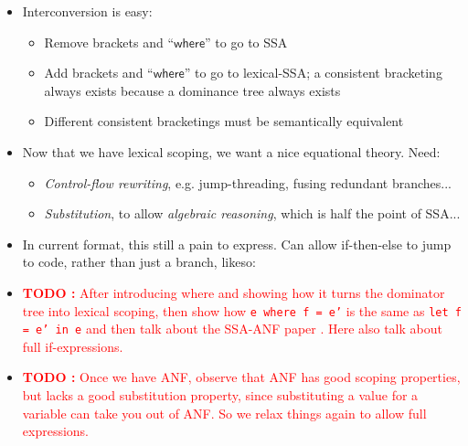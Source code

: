 \documentclass[acmsmall,screen,review]{acmart}
\newcounter{todos}
\newcommand{\TODO}[1]{{
  \stepcounter{todos}
  \begin{center}\large{\textcolor{red}{\textbf{TODO \arabic{todos}:} #1}}\end{center}
}}
\newcommand{\ms}[1]{\ensuremath{\mathsf{#1}}}
\begin{document}
\begin{itemize}
  \item Interconversion is easy:
  \begin{itemize}
    \item Remove brackets and ``\ms{where}'' to go to SSA
    \item Add brackets and ``\ms{where}'' to go to lexical-SSA; a consistent bracketing always
    exists because a dominance tree always exists
    \item Different consistent bracketings must be semantically equivalent
  \end{itemize}

  \item Now that we have lexical scoping, we want a nice equational theory. Need:
  \begin{itemize}
    \item \textit{Control-flow rewriting}, e.g. jump-threading, fusing redundant branches...
    \item \textit{Substitution}, to allow \textit{algebraic reasoning}, which is half the point of
    SSA...
  \end{itemize}

  \item In current format, this still a pain to express. Can allow if-then-else to jump to code,
        rather than just a branch, likeso:

  \item {\TODO{After introducing where and showing how it turns the dominator tree into lexical
  scoping, then show how \texttt{e where f = e'} is the same as \texttt{let f = e' in e} and then
  talk about the
  SSA-ANF paper \cite{chakravarty-functional-ssa-2003}. Here also talk about full if-expressions.}}

  \item {\TODO{Once we have ANF, observe that ANF has good scoping properties, but lacks a good substitution
    property, since substituting a value for a variable can take you out of ANF. So we relax things
    again to allow full expressions.}}
\end{itemize}
\end{document}
